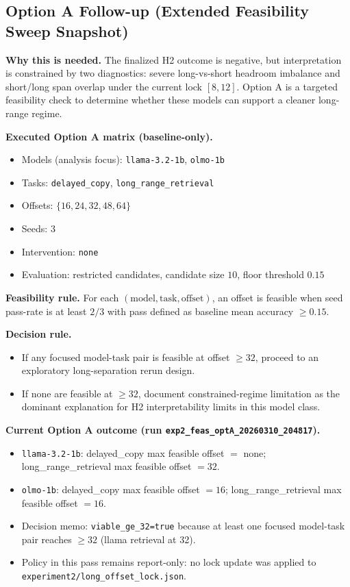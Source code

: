 \documentclass[11pt]{article}
\begin{document}
\subsection*{Option A Follow-up (Extended Feasibility Sweep Snapshot)}
\textbf{Why this is needed.} The finalized H2 outcome is negative, but interpretation is constrained by two diagnostics: severe long-vs-short headroom imbalance and short/long span overlap under the current lock \([8,12]\). Option A is a targeted feasibility check to determine whether these models can support a cleaner long-range regime.

\textbf{Executed Option A matrix (baseline-only).}
\begin{itemize}[leftmargin=*]
  \item Models (analysis focus): \texttt{llama-3.2-1b}, \texttt{olmo-1b}
  \item Tasks: \texttt{delayed\_copy}, \texttt{long\_range\_retrieval}
  \item Offsets: \(\{16,24,32,48,64\}\)
  \item Seeds: \(3\)
  \item Intervention: \texttt{none}
  \item Evaluation: restricted candidates, candidate size \(10\), floor threshold \(0.15\)
\end{itemize}

\textbf{Feasibility rule.} For each \((\text{model},\text{task},\text{offset})\), an offset is feasible when seed pass-rate is at least \(2/3\) with pass defined as baseline mean accuracy \(\ge 0.15\).

\textbf{Decision rule.}
\begin{itemize}[leftmargin=*]
  \item If any focused model-task pair is feasible at offset \(\ge 32\), proceed to an exploratory long-separation rerun design.
  \item If none are feasible at \(\ge 32\), document constrained-regime limitation as the dominant explanation for H2 interpretability limits in this model class.
\end{itemize}

\textbf{Current Option A outcome (run \texttt{exp2\_feas\_optA\_20260310\_204817}).}
\begin{itemize}[leftmargin=*]
  \item \texttt{llama-3.2-1b}: delayed\_copy max feasible offset \(=\) none; long\_range\_retrieval max feasible offset \(=32\).
  \item \texttt{olmo-1b}: delayed\_copy max feasible offset \(=16\); long\_range\_retrieval max feasible offset \(=16\).
  \item Decision memo: \texttt{viable\_ge\_32=true} because at least one focused model-task pair reaches \(\ge 32\) (llama retrieval at 32).
  \item Policy in this pass remains report-only: no lock update was applied to \texttt{experiment2/long\_offset\_lock.json}.
\end{itemize}
\end{document}
